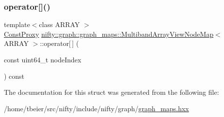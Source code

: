 \subsubsection{\texorpdfstring{operator[]()}{operator[]()}\hspace{0.1cm}{\footnotesize\ttfamily [2/2]}}
{\footnotesize\ttfamily template$<$class A\+R\+R\+AY $>$ \\
\hyperlink{classnifty_1_1graph_1_1graph__maps_1_1MultibandArrayViewNodeMap_1_1ConstProxy}{Const\+Proxy} \hyperlink{structnifty_1_1graph_1_1graph__maps_1_1MultibandArrayViewNodeMap}{nifty\+::graph\+::graph\+\_\+maps\+::\+Multiband\+Array\+View\+Node\+Map}$<$ A\+R\+R\+AY $>$\+::operator\mbox{[}$\,$\mbox{]} (\begin{DoxyParamCaption}\item[{const uint64\+\_\+t}]{node\+Index }\end{DoxyParamCaption}) const\hspace{0.3cm}{\ttfamily [inline]}}



The documentation for this struct was generated from the following file\+:\begin{DoxyCompactItemize}
\item 
/home/tbeier/src/nifty/include/nifty/graph/\hyperlink{graph__maps_8hxx}{graph\+\_\+maps.\+hxx}\end{DoxyCompactItemize}
